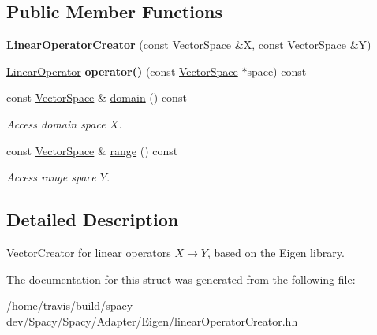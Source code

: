 \subsection*{Public Member Functions}
\begin{DoxyCompactItemize}
\item 
\hypertarget{structSpacy_1_1Rn_1_1LinearOperatorCreator_a7f00b9a6f0f656d756a65d42803e3620}{{\bfseries Linear\-Operator\-Creator} (const \hyperlink{classSpacy_1_1VectorSpace}{Vector\-Space} \&X, const \hyperlink{classSpacy_1_1VectorSpace}{Vector\-Space} \&Y)}\label{structSpacy_1_1Rn_1_1LinearOperatorCreator_a7f00b9a6f0f656d756a65d42803e3620}

\item 
\hypertarget{classSpacy_1_1Generic_1_1LinearOperatorCreator_a34e9eee442ba1bffeab9905266500bf6}{\hyperlink{classSpacy_1_1Rn_1_1LinearOperator}{Linear\-Operator} {\bfseries operator()} (const \hyperlink{classSpacy_1_1VectorSpace}{Vector\-Space} $\ast$space) const }\label{classSpacy_1_1Generic_1_1LinearOperatorCreator_a34e9eee442ba1bffeab9905266500bf6}

\item 
\hypertarget{classSpacy_1_1OperatorBase_a2588f9b3e0188820c4c494e63293dc6f}{const \hyperlink{classSpacy_1_1VectorSpace}{Vector\-Space} \& \hyperlink{classSpacy_1_1OperatorBase_a2588f9b3e0188820c4c494e63293dc6f}{domain} () const }\label{classSpacy_1_1OperatorBase_a2588f9b3e0188820c4c494e63293dc6f}

\begin{DoxyCompactList}\small\item\em Access domain space $X$. \end{DoxyCompactList}\item 
\hypertarget{classSpacy_1_1OperatorBase_ab19d3b7a6f290b1079248f1e567e53d6}{const \hyperlink{classSpacy_1_1VectorSpace}{Vector\-Space} \& \hyperlink{classSpacy_1_1OperatorBase_ab19d3b7a6f290b1079248f1e567e53d6}{range} () const }\label{classSpacy_1_1OperatorBase_ab19d3b7a6f290b1079248f1e567e53d6}

\begin{DoxyCompactList}\small\item\em Access range space $Y$. \end{DoxyCompactList}\end{DoxyCompactItemize}


\subsection{Detailed Description}
Vector\-Creator for linear operators $X\rightarrow Y$, based on the Eigen library. 

The documentation for this struct was generated from the following file\-:\begin{DoxyCompactItemize}
\item 
/home/travis/build/spacy-\/dev/\-Spacy/\-Spacy/\-Adapter/\-Eigen/linear\-Operator\-Creator.\-hh\end{DoxyCompactItemize}
